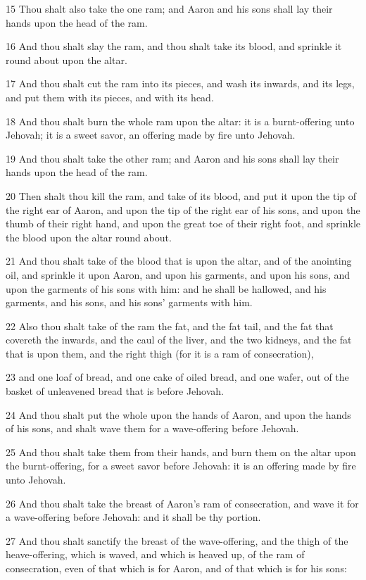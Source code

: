\par 15 Thou shalt also take the one ram; and Aaron and his sons shall lay their hands upon the head of the ram.
\par 16 And thou shalt slay the ram, and thou shalt take its blood, and sprinkle it round about upon the altar.
\par 17 And thou shalt cut the ram into its pieces, and wash its inwards, and its legs, and put them with its pieces, and with its head.
\par 18 And thou shalt burn the whole ram upon the altar: it is a burnt-offering unto Jehovah; it is a sweet savor, an offering made by fire unto Jehovah.
\par 19 And thou shalt take the other ram; and Aaron and his sons shall lay their hands upon the head of the ram.
\par 20 Then shalt thou kill the ram, and take of its blood, and put it upon the tip of the right ear of Aaron, and upon the tip of the right ear of his sons, and upon the thumb of their right hand, and upon the great toe of their right foot, and sprinkle the blood upon the altar round about.
\par 21 And thou shalt take of the blood that is upon the altar, and of the anointing oil, and sprinkle it upon Aaron, and upon his garments, and upon his sons, and upon the garments of his sons with him: and he shall be hallowed, and his garments, and his sons, and his sons' garments with him.
\par 22 Also thou shalt take of the ram the fat, and the fat tail, and the fat that covereth the inwards, and the caul of the liver, and the two kidneys, and the fat that is upon them, and the right thigh (for it is a ram of consecration),
\par 23 and one loaf of bread, and one cake of oiled bread, and one wafer, out of the basket of unleavened bread that is before Jehovah.
\par 24 And thou shalt put the whole upon the hands of Aaron, and upon the hands of his sons, and shalt wave them for a wave-offering before Jehovah.
\par 25 And thou shalt take them from their hands, and burn them on the altar upon the burnt-offering, for a sweet savor before Jehovah: it is an offering made by fire unto Jehovah.
\par 26 And thou shalt take the breast of Aaron's ram of consecration, and wave it for a wave-offering before Jehovah: and it shall be thy portion.
\par 27 And thou shalt sanctify the breast of the wave-offering, and the thigh of the heave-offering, which is waved, and which is heaved up, of the ram of consecration, even of that which is for Aaron, and of that which is for his sons:
